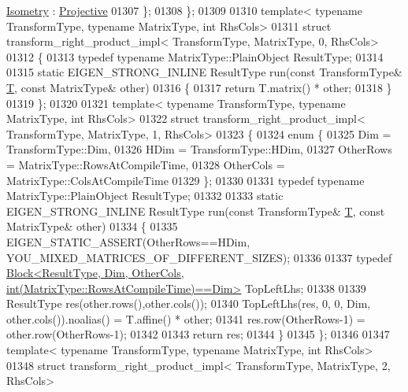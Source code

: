 \begin{DoxyCode}
      \hyperlink{group__enums_ggaee59a86102f150923b0cac6d4ff05107a080cd5366173608f701cd945c2335568}{Isometry} : \hyperlink{group__enums_ggaee59a86102f150923b0cac6d4ff05107aead6a2de12a17aaa4f5c523215dfccad}{Projective}
01307   \};
01308 \};
01309 
01310 \textcolor{keyword}{template}< \textcolor{keyword}{typename} TransformType, \textcolor{keyword}{typename} MatrixType, \textcolor{keywordtype}{int} RhsCols>
01311 \textcolor{keyword}{struct }transform\_right\_product\_impl< TransformType, MatrixType, 0, RhsCols>
01312 \{
01313   \textcolor{keyword}{typedef} \textcolor{keyword}{typename} MatrixType::PlainObject ResultType;
01314 
01315   \textcolor{keyword}{static} EIGEN\_STRONG\_INLINE ResultType run(\textcolor{keyword}{const} TransformType& \hyperlink{group___sparse_core___module}{T}, \textcolor{keyword}{const} MatrixType& other)
01316   \{
01317     \textcolor{keywordflow}{return} T.matrix() * other;
01318   \}
01319 \};
01320 
01321 \textcolor{keyword}{template}< \textcolor{keyword}{typename} TransformType, \textcolor{keyword}{typename} MatrixType, \textcolor{keywordtype}{int} RhsCols>
01322 \textcolor{keyword}{struct }transform\_right\_product\_impl< TransformType, MatrixType, 1, RhsCols>
01323 \{
01324   \textcolor{keyword}{enum} \{ 
01325     Dim = TransformType::Dim, 
01326     HDim = TransformType::HDim,
01327     OtherRows = MatrixType::RowsAtCompileTime,
01328     OtherCols = MatrixType::ColsAtCompileTime
01329   \};
01330 
01331   \textcolor{keyword}{typedef} \textcolor{keyword}{typename} MatrixType::PlainObject ResultType;
01332 
01333   \textcolor{keyword}{static} EIGEN\_STRONG\_INLINE ResultType run(\textcolor{keyword}{const} TransformType& \hyperlink{group___sparse_core___module}{T}, \textcolor{keyword}{const} MatrixType& other)
01334   \{
01335     EIGEN\_STATIC\_ASSERT(OtherRows==HDim, YOU\_MIXED\_MATRICES\_OF\_DIFFERENT\_SIZES);
01336 
01337     \textcolor{keyword}{typedef} 
      \hyperlink{group___core___module_class_eigen_1_1_block}{Block<ResultType, Dim, OtherCols, int(MatrixType::RowsAtCompileTime)==Dim>}
       TopLeftLhs;
01338 
01339     ResultType res(other.rows(),other.cols());
01340     TopLeftLhs(res, 0, 0, Dim, other.cols()).noalias() = T.affine() * other;
01341     res.row(OtherRows-1) = other.row(OtherRows-1);
01342     
01343     \textcolor{keywordflow}{return} res;
01344   \}
01345 \};
01346 
01347 \textcolor{keyword}{template}< \textcolor{keyword}{typename} TransformType, \textcolor{keyword}{typename} MatrixType, \textcolor{keywordtype}{int} RhsCols>
01348 \textcolor{keyword}{struct }transform\_right\_product\_impl< TransformType, MatrixType, 2, RhsCols>

\end{DoxyCode}
